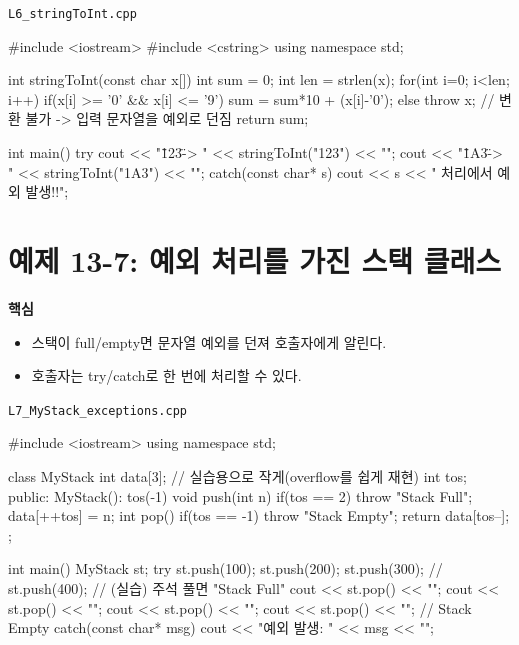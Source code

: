 \documentclass[11pt,a4paper]{article}
\newcommand{\filetag}[1]{\texttt{\color{Accent}#1}}
\begin{document}
\noindent\filetag{L6\_stringToInt.cpp}
\begin{cppcode}
#include <iostream>
#include <cstring>
using namespace std;

int stringToInt(const char x[]) {
    int sum = 0;
    int len = strlen(x);
    for(int i=0; i<len; i++) {
        if(x[i] >= '0' && x[i] <= '9')
            sum = sum*10 + (x[i]-'0');
        else
            throw x; // 변환 불가 -> 입력 문자열을 예외로 던짐
    }
    return sum;
}

int main() {
    try {
        cout << "\"123\" -> " << stringToInt("123") << "\n";
        cout << "\"1A3\" -> " << stringToInt("1A3") << "\n";
    }
    catch(const char* s) {
        cout << s << " 처리에서 예외 발생!!\n";
    }
}
\end{cppcode}

\section{예제 13-7: 예외 처리를 가진 스택 클래스}
\begin{GoalBox}
\textbf{핵심}
\begin{itemize}[leftmargin=18pt]
  \item 스택이 full/empty면 문자열 예외를 던져 호출자에게 알린다.
  \item 호출자는 try/catch로 한 번에 처리할 수 있다.
\end{itemize}
\end{GoalBox}

\noindent\filetag{L7\_MyStack\_exceptions.cpp}
\begin{cppcode}
#include <iostream>
using namespace std;

class MyStack {
    int data[3]; // 실습용으로 작게(overflow를 쉽게 재현)
    int tos;
public:
    MyStack(): tos(-1) {}
    void push(int n) {
        if(tos == 2) throw "Stack Full";
        data[++tos] = n;
    }
    int pop() {
        if(tos == -1) throw "Stack Empty";
        return data[tos--];
    }
};

int main() {
    MyStack st;
    try {
        st.push(100);
        st.push(200);
        st.push(300);
        // st.push(400); // (실습) 주석 풀면 "Stack Full"
        cout << st.pop() << "\n";
        cout << st.pop() << "\n";
        cout << st.pop() << "\n";
        cout << st.pop() << "\n"; // Stack Empty
    }
    catch(const char* msg) {
        cout << "예외 발생: " << msg << "\n";
    }
}
\end{cppcode}
\end{document}
